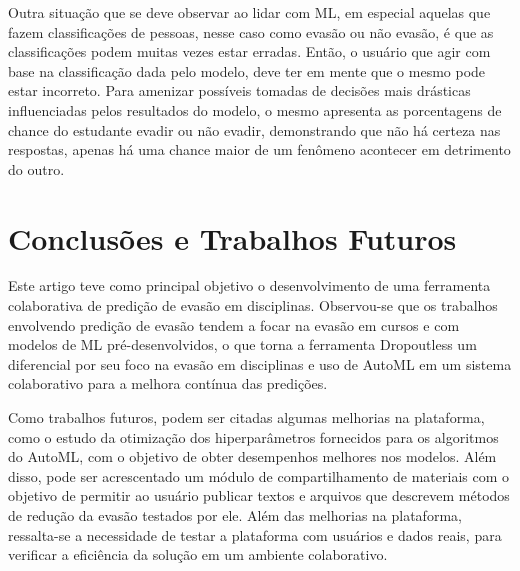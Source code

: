 \documentclass[12pt]{article}
\begin{document}
Outra situação que se deve observar ao lidar com ML, em especial aquelas que fazem classificações de pessoas, nesse caso como evasão ou não evasão, é que as classificações podem muitas vezes estar erradas. Então, o usuário que agir com base na classificação dada pelo modelo, deve ter em mente que o mesmo pode estar incorreto. Para amenizar possíveis tomadas de decisões mais drásticas influenciadas pelos resultados do modelo, o mesmo apresenta as porcentagens de chance do estudante evadir ou não evadir, demonstrando que não há certeza nas respostas, apenas há uma chance maior de um fenômeno acontecer em detrimento do outro.


\section{Conclusões e Trabalhos Futuros}
\label{sec:conclusão}

Este artigo teve como principal objetivo o desenvolvimento de uma ferramenta colaborativa de predição de evasão em disciplinas. Observou-se que os trabalhos envolvendo predição de evasão tendem a focar na evasão em cursos e com modelos de ML pré-desenvolvidos, o que torna a ferramenta Dropoutless um diferencial por seu foco na evasão em disciplinas e uso de AutoML em um sistema colaborativo para a melhora contínua das predições.

Como trabalhos futuros, podem ser citadas algumas melhorias na plataforma, como o estudo da otimização dos hiperparâmetros fornecidos para os algoritmos do AutoML, com o objetivo de obter desempenhos melhores nos modelos. Além disso, pode ser acrescentado um módulo de compartilhamento de materiais com o objetivo de permitir ao usuário publicar textos e arquivos que descrevem métodos de redução da evasão testados por ele. Além das melhorias na plataforma, ressalta-se a necessidade de testar a plataforma com usuários e dados reais, para verificar a eficiência da solução em um ambiente colaborativo.



\end{document}

